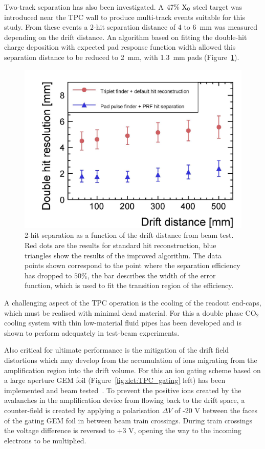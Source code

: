 Two-track separation has also been investigated. A $47\%~\rm{X_0}$ steel target was introduced near the TPC wall to produce multi-track events suitable for this study.
From these events a 2-hit separation distance of 4 to 6~mm was measured depending on the drift distance. An algorithm based on fitting the double-hit charge deposition with expected pad response function width allowed this separation distance to be reduced to 2~mm, with 1.3~mm pads (Figure~\ref{fig:det:TPC_separation}).

\begin{figure}[t!]
\centering
\includegraphics[width=0.55\hsize]{Detector/fig/TPC_separation.jpg}
\caption{2-hit separation as a function of the drift distance from beam test. Red dots are the results for standard hit reconstruction, blue triangles show the results of the improved algorithm. The data points shown correspond to the point where the separation efficiency has dropped to $50\%$, the bar describes the width of the error function, which is used to fit the transition region of the efficiency.}
\label{fig:det:TPC_separation}
\end{figure}

A challenging aspect of the TPC operation is the cooling of the readout end-caps, which must be realised with minimal dead material.  For this a double phase $\mathrm{CO}_2$ cooling system with thin low-material fluid pipes has been developed and is shown to perform adequately in test-beam experiments. 

Also critical for ultimate performance is the mitigation of the drift field distortions which may develop from the accumulation of ions migrating from the amplification region into the drift volume. For this an ion gating scheme based on a large aperture GEM foil (Figure~\ref{fig:det:TPC_gating} left) has been implemented and beam tested~\cite{ild:bib:TPC_gatinginbeam}. To prevent the positive ions created by the avalanches in the amplification device from flowing back to the drift space, a counter-field is created by applying a polarisation $\Delta V$ of -20 V between the faces of the gating GEM foil in between beam train crossings. During train crossings the voltage difference is reversed to +3 V, opening the way to the incoming electrons to be multiplied. 

